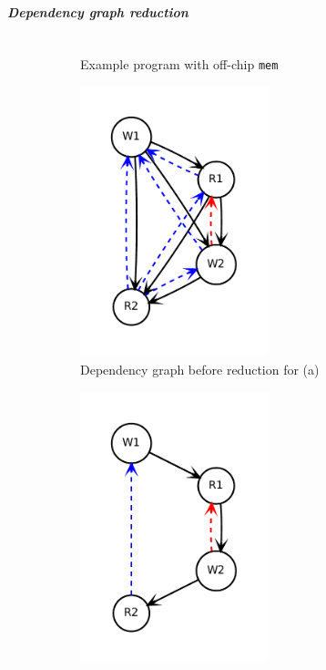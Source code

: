 \subparagraph{Dependency graph reduction}

\begin{figure}
\centering
\begin{subfigure}[b]{0.34\textwidth}
\inputminted{python}{code/graphred1.py}
\caption {
  Example program with off-chip \texttt{mem}
}
\end{subfigure}
\begin{subfigure}[b]{0.3\textwidth}
  \centering
\includegraphics[width=0.6\textwidth]{figs/graphred1.pdf}
\caption{
  Dependency graph before reduction for (a)
}
\end{subfigure}
\begin{subfigure}[b]{0.3\textwidth}
  \centering
\includegraphics[width=0.6\textwidth]{figs/graphred1_after.pdf}

\end{subfigure}
\end{figure}
